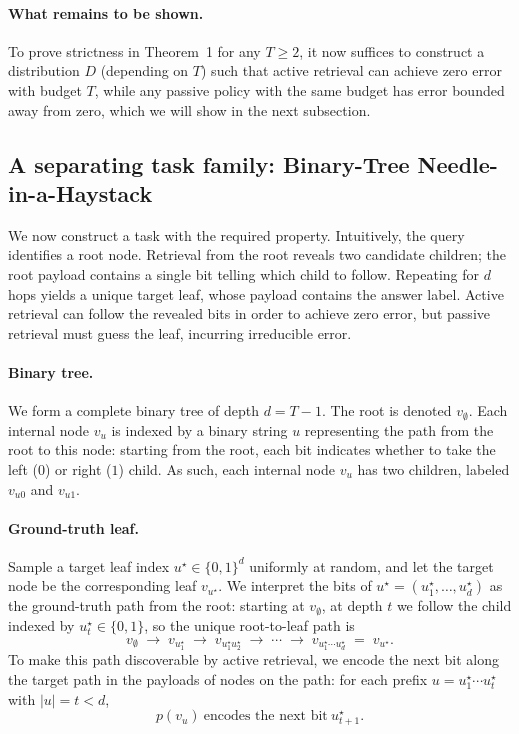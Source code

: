\paragraph{What remains to be shown.} To prove strictness in Theorem~1 for any \(T\ge 2\), it now suffices to construct a distribution \(D\) (depending on \(T\)) such that active retrieval can achieve zero error with budget \(T\), while any passive policy with the same budget has error bounded away from zero, which we will show in the next subsection.

\subsection{A separating task family: Binary-Tree Needle-in-a-Haystack}

We now construct a task with the required property. Intuitively, the query identifies a root node.
Retrieval from the root reveals two candidate children; the root payload contains a single
bit telling which child to follow. Repeating for \(d\) hops yields a unique target leaf,
whose payload contains the answer label. Active retrieval can follow the revealed bits in order to achieve zero error, but passive retrieval must guess the leaf, incurring irreducible error.

\paragraph{Binary tree.}
We form a complete binary tree of depth $d = T-1$. The root is denoted $v_\emptyset$. Each internal node $v_u$ is indexed by a binary string $u$ representing the path from the root to this node: starting from the root, each bit indicates whether to take the left ($0$) or right ($1$) child. As such, each internal node $v_u$ has two children, labeled $v_{u0}$ and $v_{u1}$.

\paragraph{Ground-truth leaf.}
Sample a target leaf index \(u^\star \in \{0,1\}^d\) uniformly at random, and let the target node be the corresponding
leaf \(v_{u^\star}\). We interpret the bits of \(u^\star = (u^\star_1,\dots,u^\star_d)\) as the ground-truth path from
the root: starting at \(v_\emptyset\), at depth \(t\) we follow the child indexed by \(u^\star_t \in \{0,1\}\), so the
unique root-to-leaf path is
\[
v_\emptyset \;\to\; v_{u^\star_1} \;\to\; v_{u^\star_1u^\star_2} \;\to\; \cdots \;\to\; v_{u^\star_1\cdots u^\star_d}
\;=\; v_{u^\star}.
\]
To make this path discoverable by active retrieval, we encode the next bit along the target path in
the payloads of nodes on the path: for each prefix \(u = u^\star_1\cdots u^\star_t\) with \(|u|=t<d\),
\[
p(v_u)\ \text{encodes the next bit}\ u^\star_{t+1}.
\]

